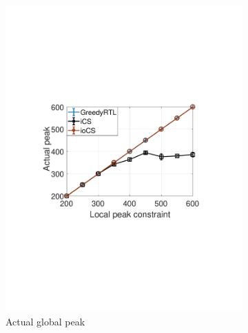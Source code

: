\documentclass[journal]{IEEEtran}
\newcommand{\revv}[1]{{\color{black}#1}}%
\begin{document}
\begin{figure}[t!]
\begin{subfigure}[b]{0.25\textwidth}
\begin{center}
						\includegraphics[width=\textwidth]{p-c.pdf}
						\caption{\revv{Actual global peak} 
}
						\label{fig:p-c}
					\end{center}
				\end{subfigure}%
				\begin{subfigure}[b]{0.25\textwidth}
					\begin{center}

\end{center}
\end{subfigure}
\end{figure}
\end{document}
